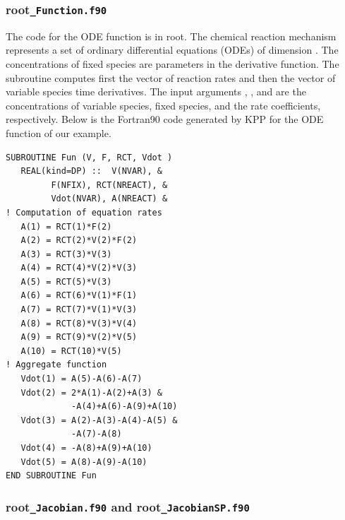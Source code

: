 \documentclass[twoside]{article}
\newcommand{\kpproot}{{\sc root}}
\begin{document}
\subsubsection{\kpproot{\tt\_Function.f90}}
\label{sec:output-ode-fun}

The code for the ODE function is in \kpproot{}. The
chemical reaction mechanism represents a set of ordinary differential
equations (ODEs) of dimension . The concentrations of fixed
species are parameters in the derivative function. The subroutine
 computes first the vector  of reaction rates and then
the vector  of variable species time derivatives. The input
arguments , , and  are the concentrations of
variable species, fixed species, and the rate coefficients,
respectively. Below is the Fortran90 code generated by KPP for the ODE
function of our  example.
%
\begin{verbatim}
SUBROUTINE Fun (V, F, RCT, Vdot )
   REAL(kind=DP) ::  V(NVAR), &
         F(NFIX), RCT(NREACT), &
         Vdot(NVAR), A(NREACT) &
! Computation of equation rates
   A(1) = RCT(1)*F(2)
   A(2) = RCT(2)*V(2)*F(2)
   A(3) = RCT(3)*V(3)
   A(4) = RCT(4)*V(2)*V(3)
   A(5) = RCT(5)*V(3)
   A(6) = RCT(6)*V(1)*F(1)
   A(7) = RCT(7)*V(1)*V(3)
   A(8) = RCT(8)*V(3)*V(4)
   A(9) = RCT(9)*V(2)*V(5)
   A(10) = RCT(10)*V(5)
! Aggregate function
   Vdot(1) = A(5)-A(6)-A(7)
   Vdot(2) = 2*A(1)-A(2)+A(3) &
             -A(4)+A(6)-A(9)+A(10)
   Vdot(3) = A(2)-A(3)-A(4)-A(5) &
             -A(7)-A(8)
   Vdot(4) = -A(8)+A(9)+A(10)
   Vdot(5) = A(8)-A(9)-A(10)
END SUBROUTINE Fun
\end{verbatim}

\subsubsection{\kpproot{\tt\_Jacobian.f90} and \kpproot{\tt\_JacobianSP.f90}}
\label{sec:output-ode-jac}
\end{document}
